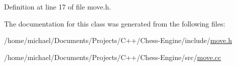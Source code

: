 Definition at line 17 of file move.\+h.



The documentation for this class was generated from the following files\+:\begin{DoxyCompactItemize}
\item 
/home/michael/\+Documents/\+Projects/\+C++/\+Chess-\/\+Engine/include/\mbox{\hyperlink{move_8h}{move.\+h}}\item 
/home/michael/\+Documents/\+Projects/\+C++/\+Chess-\/\+Engine/src/\mbox{\hyperlink{move_8cc}{move.\+cc}}\end{DoxyCompactItemize}
